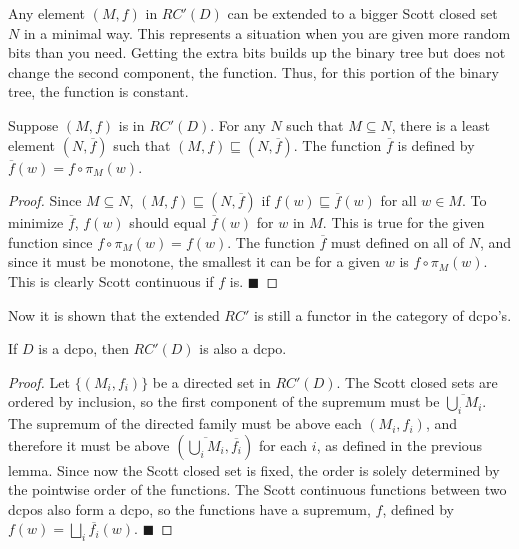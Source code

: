 Any element $(M,f)$ in $RC'(D)$ can be extended to a bigger Scott closed set $N$ in a minimal way.  This represents a situation when you are given more random bits than you need.  Getting the extra bits builds up the binary tree but does not change the second component, the function.  Thus, for this portion of the binary tree, the function is constant.
\begin{lemma}
Suppose $(M,f)$ is in $RC'(D)$.  For any $N$ such that $M\subseteq N$, there is a least element $(N,\overline{f})$ such that $(M,f) \sqsubseteq (N,\overline{f})$.  The function $\overline{f}$ is defined by $\overline{f}(w) = f\circ \pi_M(w)$.
\end{lemma}
\begin{proof}
Since $M\subseteq N$, $(M,f) \sqsubseteq (N,\overline{f})$ if $f(w) \sqsubseteq \overline{f}(w)$ for all $w\in M$.  To minimize $\overline{f}$, $f(w)$ should equal $\overline{f}(w)$ for $w$ in $M$.  This is true for the given function since $f\circ \pi_M(w) = f(w)$.  The function $\overline{f}$ must defined on all of $N$, and since it must be monotone, the smallest it can be for a given $w$ is $f\circ \pi_M(w)$.  This is clearly Scott continuous if $f$ is.
\hfill $\blacksquare$
\end{proof}

Now it is shown that the extended $RC'$ is still a functor in the category of dcpo's.
\begin{proposition}
If $D$ is a dcpo, then $RC'(D)$ is also a dcpo.
\end{proposition}
\begin{proof}
Let $\{(M_i,f_i)\}$ be a directed set in $RC'(D)$.  The Scott closed sets are ordered by inclusion, so the first component of the supremum must be $\overline{\bigcup_i M_i}$.  The supremum of the directed family must be above each $(M_i,f_i)$, and therefore it must be above $(\overline{\bigcup_i M_i}, \overline{f_i})$ for each $i$, as defined in the previous lemma.  Since now the Scott closed set is fixed, the order is solely determined by the pointwise order of the functions.  The Scott continuous functions between two dcpos also form a dcpo, so the functions have a supremum, $f$, defined by $f(w) = \bigsqcup_i \overline{f_i}(w)$.
\hfill $\blacksquare$
\end{proof}


